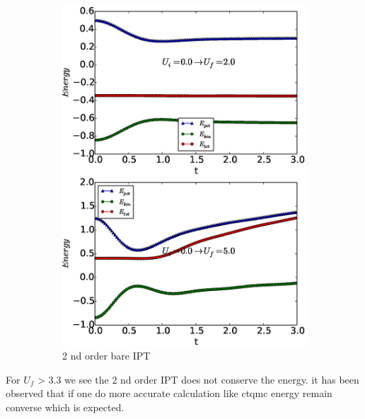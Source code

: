 \begin{figure}[H]
\begin{subfigure}{.5\textwidth}
  \includegraphics[width=1\linewidth]{bench_marking/energy.eps}
  \caption{2 nd order bare IPT}
\end{subfigure}
\caption{}
\end{figure}

For $U_f$ > 3.3 we see the 2 nd order IPT does not conserve the energy. it has been observed that if one do more accurate calculation like ctqmc \cite{HUB} energy remain converse which is expected.
